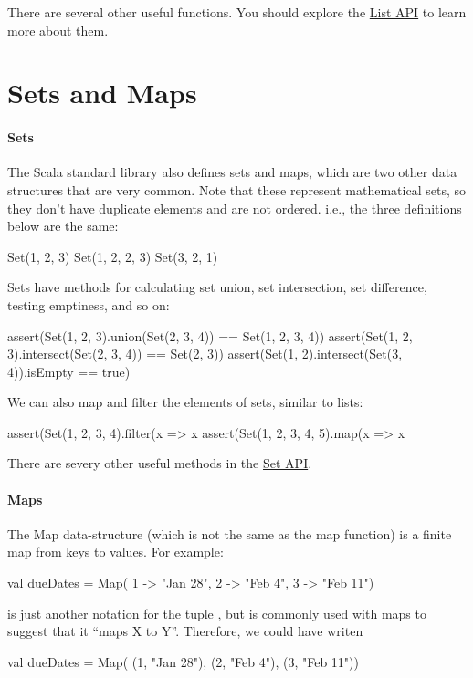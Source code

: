 \documentclass[9pt]{extbook}
\begin{document}
There are several other useful functions. You should explore the
\href{http://www.scala-lang.org/api/2.11.7/index.html#scala.collection.immutable.List}{List API} to learn more about them.

\section{Sets and Maps}

\paragraph{Sets}
%
The Scala standard library also defines sets and maps, which are two other data
structures that are very common. Note that these represent mathematical sets, so
they don't have duplicate elements and are not ordered. i.e., the three
definitions below are the same:
%
\begin{scalacode}
Set(1, 2, 3)
Set(1, 2, 2, 3)
Set(3, 2, 1)
\end{scalacode}

Sets have methods for calculating set union, set intersection, set difference,
testing emptiness, and so on:
%
\begin{scalacode}
assert(Set(1, 2, 3).union(Set(2, 3, 4)) == Set(1, 2, 3, 4))
assert(Set(1, 2, 3).intersect(Set(2, 3, 4)) == Set(2, 3))
assert(Set(1, 2).intersect(Set(3, 4)).isEmpty == true)
\end{scalacode}

We can also map and filter the elements of sets, similar to lists:
%
\begin{scalacode}
assert(Set(1, 2, 3, 4).filter(x => x %
assert(Set(1, 2, 3, 4, 5).map(x => x %
\end{scalacode}

There are severy other useful methods in the
\href{http://www.scala-lang.org/api/2.11.7/index.html#scala.collection.immutable.Set}{Set API}.

\paragraph{Maps}
The Map data-structure (which is not the same as the map function) is a finite
map from keys to values. For example:
%
\begin{scalacode}
val dueDates = Map(
  1 -> "Jan 28",
  2 -> "Feb 4",
  3 -> "Feb 11")
\end{scalacode}

\begin{notation}
 is just another notation for the tuple
, but is commonly used with maps to suggest that it
``maps X to Y''. Therefore, we could have writen
\begin{scalacode}
val dueDates = Map(
  (1, "Jan 28"),
  (2, "Feb 4"),
  (3, "Feb 11"))
\end{scalacode}
\end{notation}
\end{document}
